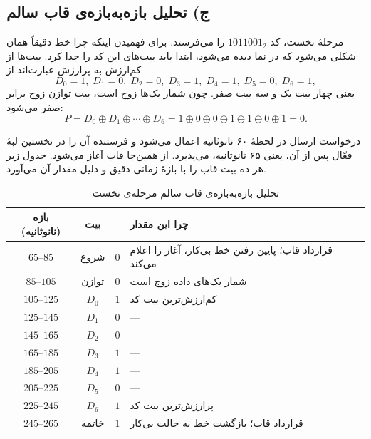 \documentclass[12pt,a4paper]{article}
\begin{document}
	\subsection*{ج) تحلیل بازه‌به‌بازه‌ی قاب سالم}
	مرحلهٔ نخست، کد \(1011001_2\) را می‌فرستد. برای فهمیدن اینکه چرا خط  دقیقاً همان شکلی می‌شود که در نما دیده می‌شود، ابتدا باید بیت‌های این کد را جدا کرد. بیت‌ها از کم‌ارزش به پرارزش عبارت‌اند از
	\[
	D_0=1,\; D_1=0,\; D_2=0,\; D_3=1,\; D_4=1,\; D_5=0,\; D_6=1,
	\]
	یعنی چهار بیت یک و سه بیت صفر. چون شمار یک‌ها زوج است، بیت توازن زوج برابر صفر می‌شود:
	\[
	P = D_0\oplus D_1\oplus\cdots\oplus D_6 = 1\oplus0\oplus0\oplus1\oplus1\oplus0\oplus1 = 0 .
	\]

	درخواست ارسال در لحظهٔ ۶۰ نانوثانیه اعمال می‌شود و فرستنده آن را در نخستین لبهٔ فعّال پس از آن، یعنی ۶۵ نانوثانیه، می‌پذیرد. از همین‌جا قاب آغاز می‌شود. جدول زیر هر ده بیت قاب را با بازهٔ زمانی دقیق و دلیل مقدار آن می‌آورد.

	\begin{table}[H]
		\centering
		\footnotesize
		\begin{tabular}{|c|c|c|l|}
			\hline
			\textbf{بازه (نانوثانیه)} & \textbf{بیت} & \textbf{\lr{tx}} & \textbf{چرا این مقدار} \\ \hline
			\(65\)--\(85\)   & شروع        & \(0\) & قرارداد قاب؛ پایین رفتن خط بی‌کار، آغاز را اعلام می‌کند \\ \hline
			\(85\)--\(105\)  & توازن       & \(0\) & شمار یک‌های داده زوج است \\ \hline
			\(105\)--\(125\) & \(D_0\)     & \(1\) & کم‌ارزش‌ترین بیت کد \\ \hline
			\(125\)--\(145\) & \(D_1\)     & \(0\) & --- \\ \hline
			\(145\)--\(165\) & \(D_2\)     & \(0\) & --- \\ \hline
			\(165\)--\(185\) & \(D_3\)     & \(1\) & --- \\ \hline
			\(185\)--\(205\) & \(D_4\)     & \(1\) & --- \\ \hline
			\(205\)--\(225\) & \(D_5\)     & \(0\) & --- \\ \hline
			\(225\)--\(245\) & \(D_6\)     & \(1\) & پرارزش‌ترین بیت کد \\ \hline
			\(245\)--\(265\) & خاتمه       & \(1\) & قرارداد قاب؛ بازگشت خط به حالت بی‌کار \\ \hline
		\end{tabular}
		\caption{تحلیل بازه‌به‌بازه‌ی قاب سالم مرحله‌ی نخست}
	\end{table}
\end{document}
